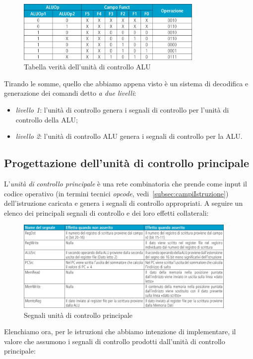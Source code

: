 \documentclass[class=book, crop=false, oneside]{standalone}
\begin{document}
\begin{figure}[H]
	\centering
	\includegraphics[width=0.80\textwidth,keepaspectratio]{tabella_verita_controllo_ALU.png}
	\caption{Tabella verità dell'unità di controllo ALU}
\end{figure}
Tirando le somme, quello che abbiamo appena visto è un sistema di decodifica e generazione dei comandi detto \emph{a due livelli}:
\begin{itemize}
	\item \emph{livello 1}: l'unità di controllo genera i segnali di controllo  per l'unità di controllo della ALU;
	\item \emph{livello 2}: l'unità di controllo ALU genera i segnali di controllo per la ALU.
\end{itemize}

\subsection{Progettazione dell'unità di controllo principale}
L'\emph{unità di controllo principale} è una rete combinatoria che prende come input il codice operativo (in termini tecnici \emph{opcode}, vedi~\ref{subsec:campiIstruzione}) dell'istruzione caricata e genera i segnali di controllo appropriati. A seguire un elenco dei principali segnali di controllo e dei loro effetti collaterali:

\begin{figure}[H]
	\centering
	\includegraphics[width=0.95\textwidth,keepaspectratio]{segnali_controllo.png}
	\caption{Segnali unità di controllo principale}
\end{figure}
Elenchiamo ora, per le istruzioni che abbiamo intenzione di implementare, il valore che assumono i segnali di controllo prodotti dall'unità di controllo principale:
\end{document}

